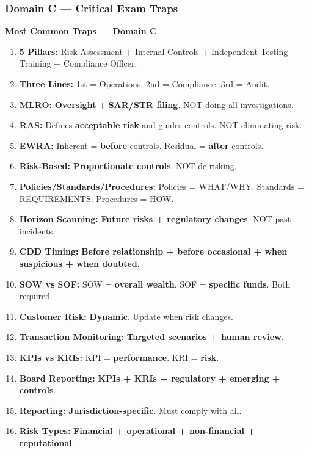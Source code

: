 \documentclass[12pt,aspectratio=169]{beamer}
\renewcommand{\scriptsize}{\fontsize{4.5}{5.5}\selectfont}
\begin{document}
	\begin{frame}
		\frametitle{\fontsize{11}{13}\selectfont \textbf{Domain C — Critical Exam Traps}}
		\scriptsize
		\begin{block}{\fontsize{7}{9}\selectfont \textbf{Most Common Traps — Domain C}}
			\scriptsize
			\begin{enumerate}
				\item \textbf{5 Pillars:} Risk Assessment + Internal Controls + Independent Testing + Training + Compliance Officer.
				\item \textbf{Three Lines:} 1st = Operations. 2nd = Compliance. 3rd = Audit.
				\item \textbf{MLRO:} \textbf{Oversight} + \textbf{SAR/STR filing}. NOT doing all investigations.
				\item \textbf{RAS:} Defines \textbf{acceptable risk} and guides controls. NOT eliminating risk.
				\item \textbf{EWRA:} Inherent = \textbf{before} controls. Residual = \textbf{after} controls.
				\item \textbf{Risk-Based:} \textbf{Proportionate controls}. NOT de-risking.
				\item \textbf{Policies/Standards/Procedures:} Policies = WHAT/WHY. Standards = REQUIREMENTS. Procedures = HOW.
				\item \textbf{Horizon Scanning:} \textbf{Future risks + regulatory changes}. NOT past incidents.
				\item \textbf{CDD Timing:} \textbf{Before relationship + before occasional + when suspicious + when doubted}.
				\item \textbf{SOW vs SOF:} SOW = \textbf{overall wealth}. SOF = \textbf{specific funds}. Both required.
				\item \textbf{Customer Risk:} \textbf{Dynamic}. Update when risk changes.
				\item \textbf{Transaction Monitoring:} \textbf{Targeted scenarios + human review}.
				\item \textbf{KPIs vs KRIs:} KPI = \textbf{performance}. KRI = \textbf{risk}.
				\item \textbf{Board Reporting:} \textbf{KPIs + KRIs + regulatory + emerging + controls}.
				\item \textbf{Reporting:} \textbf{Jurisdiction-specific}. Must comply with all.
				\item \textbf{Risk Types:} \textbf{Financial + operational + non-financial + reputational}.

\end{enumerate}
\end{block}
\end{frame}
\end{document}
